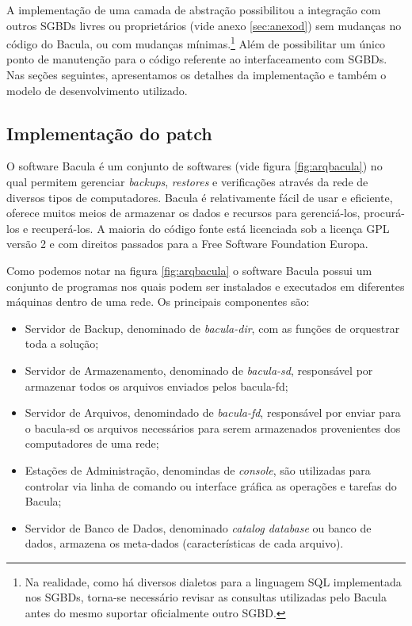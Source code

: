 A implementação de uma camada de abstração possibilitou a integração com outros SGBDs livres ou proprietários (vide anexo \ref{sec:anexod}) sem mudanças no código do Bacula, ou com mudanças mínimas.\footnote{Na realidade, como há diversos dialetos para a linguagem SQL implementada nos SGBDs, torna-se necessário revisar as consultas utilizadas pelo Bacula antes do mesmo suportar oficialmente outro SGBD.} Além de possibilitar um único ponto de manutenção para o código referente ao interfaceamento com SGBDs. Nas seções seguintes, apresentamos os detalhes da implementação e também o modelo de desenvolvimento utilizado.

\subsection{Implementação do patch} \label{sec:anexoe}

O software Bacula é um conjunto de softwares (vide figura \ref{fig:arqbacula}) no qual permitem gerenciar \textit{backups}, \textit{restores} e verificações através da rede de diversos tipos de computadores. Bacula é relativamente fácil de usar e eficiente, oferece muitos meios de armazenar os dados e recursos para gerenciá-los, procurá-los e recuperá-los. A maioria do código fonte está licenciada sob a licença GPL versão 2 e com direitos passados para a Free Software Foundation Europa.

Como podemos notar na figura \ref{fig:arqbacula} o software Bacula possui um conjunto de programas nos quais podem ser instalados e executados em diferentes máquinas dentro de uma rede.
Os principais componentes são:
\begin{itemize}
\item Servidor de Backup, denominado de \textit{bacula-dir}, com as funções de orquestrar toda a solução;
\item Servidor de Armazenamento, denominado de \textit{bacula-sd}, responsável por armazenar todos os arquivos enviados pelos bacula-fd;
\item Servidor de Arquivos, denomindado de \textit{bacula-fd}, responsável por enviar para o bacula-sd os arquivos necessários para serem armazenados provenientes dos computadores de uma rede;
\item Estações de Administração, denomindas de \textit{console}, são utilizadas para controlar via linha de comando ou interface gráfica as operações e tarefas do Bacula;
\item Servidor de Banco de Dados, denominado \textit{catalog database} ou banco de dados, armazena os meta-dados (características de cada arquivo).
\end{itemize}

